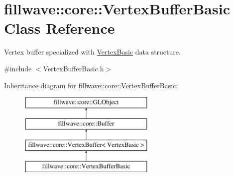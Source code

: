 \hypertarget{classfillwave_1_1core_1_1VertexBufferBasic}{}\section{fillwave\+:\+:core\+:\+:Vertex\+Buffer\+Basic Class Reference}
\label{classfillwave_1_1core_1_1VertexBufferBasic}


Vertex buffer specialized with \hyperlink{structfillwave_1_1core_1_1VertexBasic}{Vertex\+Basic} data structure.  




{\ttfamily \#include $<$Vertex\+Buffer\+Basic.\+h$>$}

Inheritance diagram for fillwave\+:\+:core\+:\+:Vertex\+Buffer\+Basic\+:\begin{figure}[H]
\begin{center}
\leavevmode
\includegraphics[height=4.000000cm]{classfillwave_1_1core_1_1VertexBufferBasic}
\end{center}
\end{figure}
